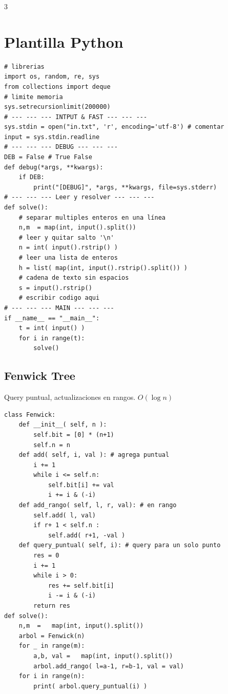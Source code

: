 \documentclass[8pt, spanish, mexico, letterpaper]{extarticle}
\newcommand{\<}{<}
\begin{document}
\begin{multicols*}{3}
\section{Plantilla Python}
\begin{verbatim}
# librerias
import os, random, re, sys
from collections import deque
# limite memoria
sys.setrecursionlimit(200000)
# --- --- --- INTPUT & FAST --- --- ---
sys.stdin = open("in.txt", 'r', encoding='utf-8') # comentar
input = sys.stdin.readline
# --- --- --- DEBUG --- --- ---
DEB = False # True False
def debug(*args, **kwargs):
    if DEB:
        print("[DEBUG]", *args, **kwargs, file=sys.stderr)
# --- --- --- Leer y resolver --- --- ---
def solve():
    # separar multiples enteros en una línea
    n,m  = map(int, input().split())  
    # leer y quitar salto '\n'
    n = int( input().rstrip() ) 
    # leer una lista de enteros
    h = list( map(int, input().rstrip().split()) )
    # cadena de texto sin espacios
    s = input().rstrip()
    # escribir codigo aqui
# --- --- --- MAIN --- --- ---
if __name__ == "__main__":
    t = int( input() ) 
    for i in range(t):
        solve()   
\end{verbatim}


\subsection{Fenwick Tree}

Query puntual, actualizaciones en rangos. $O(\log n)$

\begin{verbatim}   
class Fenwick:
    def __init__( self, n ):
        self.bit = [0] * (n+1)
        self.n = n
    def add( self, i, val ): # agrega puntual
        i += 1
        while i <= self.n:
            self.bit[i] += val
            i += i & (-i)  
    def add_rango( self, l, r, val): # en rango
        self.add( l, val)
        if r+ 1 < self.n :
            self.add( r+1, -val )
    def query_puntual( self, i): # query para un solo punto
        res = 0
        i += 1
        while i > 0:
            res += self.bit[i]
            i -= i & (-i)
        return res 
def solve():
    n,m  =   map(int, input().split())
    arbol = Fenwick(n)
    for _ in range(m):
        a,b, val =   map(int, input().split())
        arbol.add_rango( l=a-1, r=b-1, val = val)
    for i in range(n):
        print( arbol.query_puntual(i) )
\end{verbatim}


\clearpage

\end{multicols*}
\end{document}

